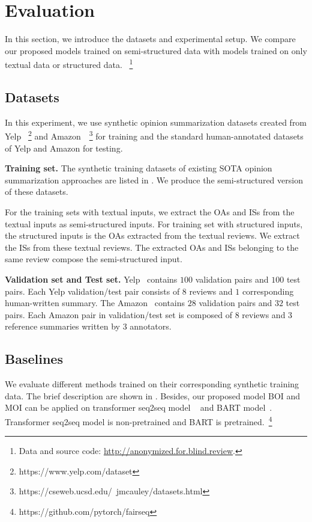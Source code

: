 \section{Evaluation}
\label{sec:eval}
In this section, we introduce the datasets and experimental setup.
We compare our proposed models trained on semi-structured data
with models trained on only 
textual data or structured data.
~\footnote{ Data and source code: \url{http://anonymized.for.blind.review}.}

\subsection{Datasets}
In this experiment, we use synthetic opinion summarization datasets created from Yelp
~\footnote{https://www.yelp.com/dataset} and Amazon~\cite{HeM16}~\footnote{https://cseweb.ucsd.edu/~jmcauley/datasets.html} for training and
the standard human-annotated datasets of Yelp and Amazon for testing. 

\textbf{Training set.} The synthetic training datasets of existing SOTA opinion summarization approaches
are listed in . We produce the semi-structured
version of these datasets.

For the training sets with textual inputs, 
we extract the OAs and ISs from the 
textual inputs as semi-structured inputs. 
For training set with structured inputs, 
the structured inputs is the OAs extracted from the textual reviews.
We extract the ISs from these textual reviews.
The extracted OAs and ISs belonging to the same review compose the semi-structured 
input.

\textbf{Validation set and Test set.} 
Yelp~\cite{MeanSum19} contains $100$ validation pairs and $100$ test pairs. Each Yelp validation/test pair consists of $8$ reviews and $1$ corresponding human-written summary.
The Amazon~\cite{Copycat20} contains $28$ validation pairs and $32$ test pairs. Each Amazon pair in validation/test set is composed of $8$ reviews and $3$ reference summaries written by $3$ annotators.

\subsection{Baselines}

We evaluate different methods trained on their corresponding synthetic training data.
The brief description are shown in .
Besides, our proposed model BOI and MOI can be applied on transformer seq2seq model
~\cite{Transformer17}
and BART model~\cite{BART20}. Transformer seq2seq model is non-pretrained
and BART is pretrained.~\footnote{https://github.com/pytorch/fairseq}

